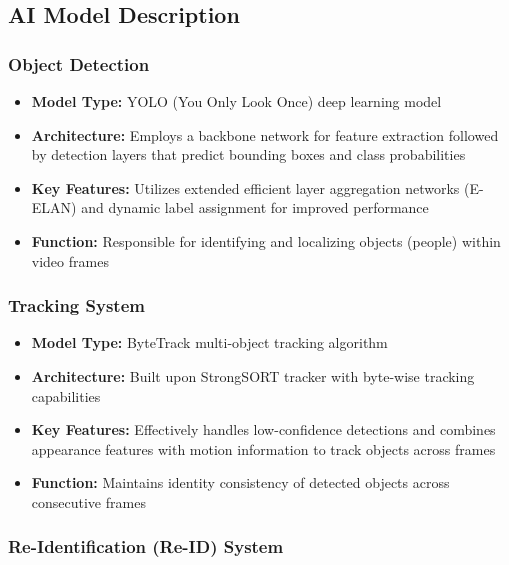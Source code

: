 \subsection{AI Model Description}
\label{subsection:ai-model-description}

\subsubsection{Object Detection}
\label{subsubsection:object-detection}

\begin{itemize}
    \item \textbf{Model Type:} YOLO (You Only Look Once) deep learning model
    \item \textbf{Architecture:} Employs a backbone network for feature extraction followed by detection layers that predict bounding boxes and class probabilities
    \item \textbf{Key Features:} Utilizes extended efficient layer aggregation networks (E-ELAN) and dynamic label assignment for improved performance
    \item \textbf{Function:} Responsible for identifying and localizing objects (people) within video frames
\end{itemize}

\subsubsection{Tracking System}
\label{subsubsection:tracking-system}

\begin{itemize}
    \item \textbf{Model Type:} ByteTrack multi-object tracking algorithm
    \item \textbf{Architecture:} Built upon StrongSORT tracker with byte-wise tracking capabilities
    \item \textbf{Key Features:} Effectively handles low-confidence detections and combines appearance features with motion information to track objects across frames
    \item \textbf{Function:} Maintains identity consistency of detected objects across consecutive frames
\end{itemize}

\subsubsection{Re-Identification (Re-ID) System}
\label{subsubsection:reid-system}


